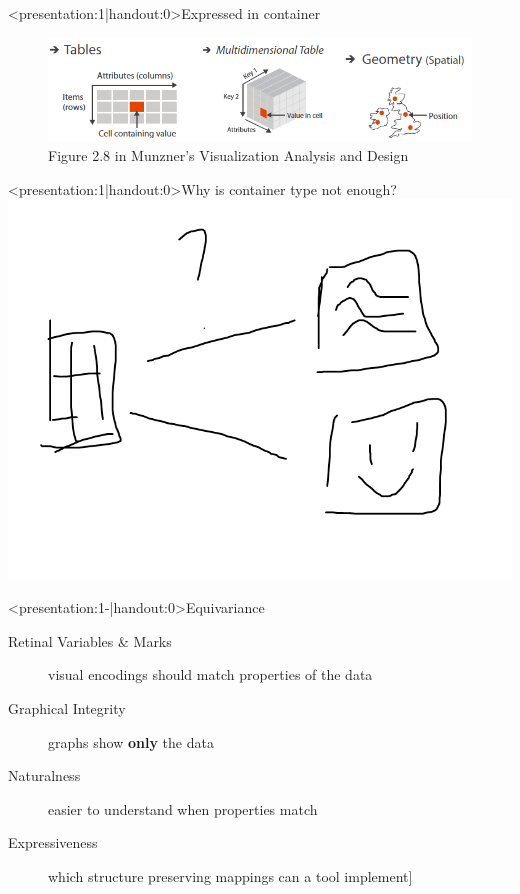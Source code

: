 \documentclass[xcolor={dvipsnames}]{beamer}
\begin{document}
\begin{frame}<presentation:1|handout:0>{Expressed in container} 
    \begin{figure}
        \includegraphics[width=1\textwidth]{figures/intro/munzner_datatypes.png}
        \caption{Figure 2.8 in Munzner's Visualization Analysis and Design\cite{munznerVisualizationAnalysisDesign2014}}
    \end{figure}
\end{frame}

\begin{frame}<presentation:1|handout:0>{Why is container type not enough?}
    \includegraphics[width=1\linewidth]{../paper/figures/whycontinuity.png}
\end{frame}

\begin{frame}<presentation:1-|handout:0>{Equivariance}
    \begin{description}
        \item[Retinal Variables \& Marks] visual encodings should match properties of the data \cite{bertinSemiologyGraphicsDiagrams2011a}
        \pause
        \item[Graphical Integrity] graphs show \textbf{only} the data\cite{tufteVisualDisplayQuantitative2001}
        \pause 
        \item[Naturalness] easier to understand when properties match\cite{norman_things_smart}
        \pause
        \item[Expressiveness] which structure preserving mappings can a tool implement\cite{mackinlayAutomatingDesignGraphical1986}] 
    \end{description}
\end{frame}
\end{document}

